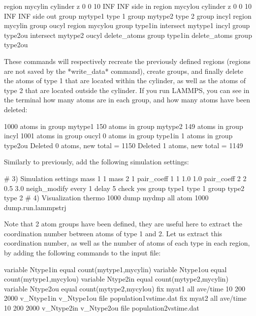 \begin{lcverbatim}
region mycylin cylinder z 0 0 10 INF INF side in
region mycylou cylinder z 0 0 10 INF INF side out
group mytype1 type 1
group mytype2 type 2
group incyl region mycylin
group oucyl region mycylou
group type1in intersect mytype1 incyl
group type2ou intersect mytype2 oucyl
delete_atoms group type1in
delete_atoms group type2ou
\end{lcverbatim}

These commands will respectively recreate
the previously defined regions (regions are not saved by the
*write_data* command), create groups, and finally delete the
atoms of type 1 that are located within the cylinder, as
well as the atoms of type 2 that are located outside the
cylinder. If you run LAMMPS, you can see in the terminal how
many atoms are in each group, and how many atoms have been
deleted:



\begin{lcverbatim}
1000 atoms in group mytype1
150 atoms in group mytype2
149 atoms in group incyl
1001 atoms in group oucyl
0 atoms in group type1in
1 atoms in group type2ou
Deleted 0 atoms, new total = 1150
Deleted 1 atoms, new total = 1149
\end{lcverbatim}

Similarly to previously, add the following simulation
settings:



\begin{lcverbatim}
# 3) Simulation settings
mass 1 1
mass 2 1
pair_coeff 1 1 1.0 1.0
pair_coeff 2 2 0.5 3.0
neigh_modify every 1 delay 5 check yes
group type1 type 1
group type2 type 2
# 4) Visualization
thermo 1000
dump mydmp all atom 1000 dump.run.lammpstrj
\end{lcverbatim}

Note that 2 atom groups have been defined, they are useful
here to extract the coordination number between atoms of
type 1 and 2. Let us extract this coordination number, as
well as the number of atoms of each type in each region, by
adding the following commands to the input file:



\begin{lcverbatim}
variable Ntype1in equal count(mytype1,mycylin)
variable Ntype1ou equal count(mytype1,mycylou)
variable Ntype2in equal count(mytype2,mycylin)
variable Ntype2ou equal count(mytype2,mycylou)
fix myat1 all ave/time 10 200 2000 v_Ntype1in v_Ntype1ou file population1vstime.dat
fix myat2 all ave/time 10 200 2000 v_Ntype2in v_Ntype2ou file population2vstime.dat
\end{lcverbatim}

